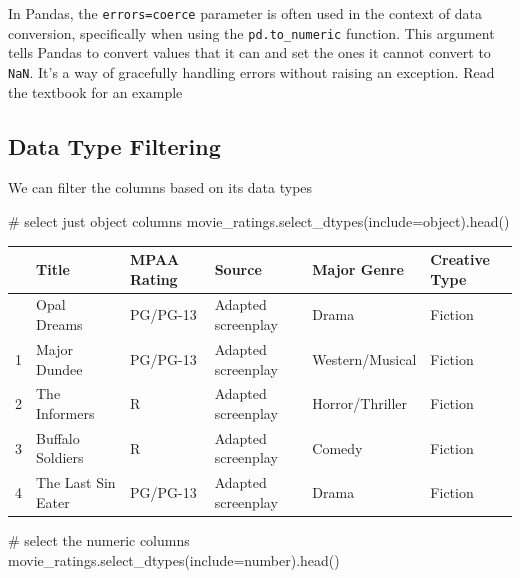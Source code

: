\documentclass[
  letterpaper,
  DIV=11,
  numbers=noendperiod]{scrreprt}
\newenvironment{Shaded}{\begin{snugshade}}{\end{snugshade}}
\newcommand{\CommentTok}[1]{\textcolor[rgb]{0.37,0.37,0.37}{#1}}
\newcommand{\NormalTok}[1]{\textcolor[rgb]{0.00,0.23,0.31}{#1}}
\newcommand{\OperatorTok}[1]{\textcolor[rgb]{0.37,0.37,0.37}{#1}}
\newcommand{\StringTok}[1]{\textcolor[rgb]{0.13,0.47,0.30}{#1}}
\begin{document}
In Pandas, the
\texttt{errors=\textquotesingle{}coerce\textquotesingle{}} parameter is
often used in the context of data conversion, specifically when using
the \texttt{pd.to\_numeric} function. This argument tells Pandas to
convert values that it can and set the ones it cannot convert to
\texttt{NaN}. It's a way of gracefully handling errors without raising
an exception. Read the textbook for an example

\hypertarget{data-type-filtering}{%
\subsection{Data Type Filtering}\label{data-type-filtering}}

We can filter the columns based on its data types

\begin{Shaded}
\begin{Highlighting}[]

\CommentTok{\# select just object columns}
\NormalTok{movie\_ratings.select\_dtypes(include}\OperatorTok{=}\StringTok{\textquotesingle{}object\textquotesingle{}}\NormalTok{).head()}
\end{Highlighting}
\end{Shaded}

\begin{longtable}[]{@{}llllll@{}}
\toprule\noalign{}
& Title & MPAA Rating & Source & Major Genre & Creative Type \\
\midrule\noalign{}
\endhead
\bottomrule\noalign{}
\endlastfoot
0 & Opal Dreams & PG/PG-13 & Adapted screenplay & Drama & Fiction \\
1 & Major Dundee & PG/PG-13 & Adapted screenplay & Western/Musical &
Fiction \\
2 & The Informers & R & Adapted screenplay & Horror/Thriller &
Fiction \\
3 & Buffalo Soldiers & R & Adapted screenplay & Comedy & Fiction \\
4 & The Last Sin Eater & PG/PG-13 & Adapted screenplay & Drama &
Fiction \\
\end{longtable}

\begin{Shaded}
\begin{Highlighting}[]
\CommentTok{\# select the numeric columns}
\NormalTok{movie\_ratings.select\_dtypes(include}\OperatorTok{=}\StringTok{\textquotesingle{}number\textquotesingle{}}\NormalTok{).head()}
\end{Highlighting}
\end{Shaded}
\end{document}
